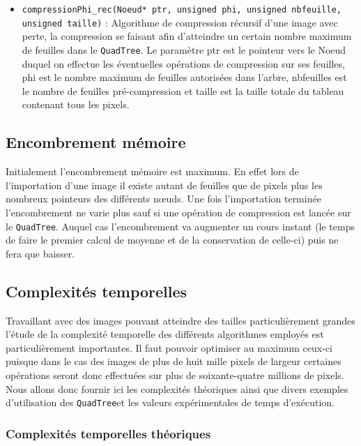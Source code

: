 \documentclass{article}
\newcommand{\info}{\texttt}
\newcommand{\qt}{\info{QuadTree}}
\begin{document}
\begin{itemize}
	    	\item \info{compressionPhi_rec(Noeud* ptr, unsigned phi, unsigned nbfeuille, unsigned taille)} : Algorithme de compression récursif d'une image avec perte, la compression se faisant afin d'atteindre un certain nombre maximum de feuilles dans le \qt. Le paramètre ptr est le pointeur vers le Noeud duquel on effectue les éventuelles opérations de compression sur ses feuilles, phi est le nombre maximum de feuilles autorisées dans l'arbre, nbfeuilles est le nombre de feuilles pré-compression et taille est la taille totale du tableau contenant tous les pixels.
	    \end{itemize}
    
    \subsection{Encombrement mémoire}
    
    Initialement l'encombrement mémoire est maximum. En effet lors de l'importation d'une image il existe autant de feuilles que de pixels plus les nombreux pointeurs des différents nœuds. Une fois l'importation terminée l'encombrement ne varie plus sauf si une opération de compression est lancée sur le \qt. Auquel cas l'encombrement va augmenter un cours instant (le temps de faire le premier calcul de moyenne et de la conservation de celle-ci) puis ne fera que baisser.
    
    \subsection{Complexités temporelles}

    Travaillant avec des images pouvant atteindre des tailles particulièrement grandes l'étude de la complexité temporelle des différents algorithmes employés est particulièrement importantes. Il faut pouvoir optimiser au maximum ceux-ci puisque dans le cas des images de plus de huit mille pixels de largeur certaines opérations seront donc effectuées sur plus de soixante-quatre millions de pixels. Nous allons donc fournir ici les complexités théoriques ainsi que divers exemples d'utilisation des \qt et les valeurs expérimentales de temps d'exécution.
    
        \subsubsection{Complexités temporelles théoriques}
        
\end{document}
